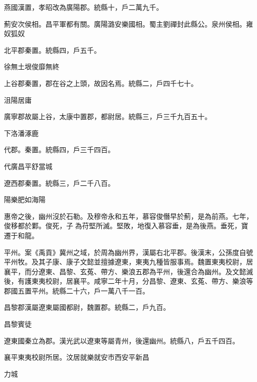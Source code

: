 \begin{pinyinscope}
 燕國漢置，孝昭改為廣陽郡。統縣十，戶二萬九千。



 薊安次侯相。昌平軍都有關。廣陽潞安樂國相。蜀主劉禪封此縣公。泉州侯相。雍奴狐奴



 北平郡秦置。統縣四，戶五千。



 徐無土垠俊靡無終



 上谷郡秦置，郡在谷之上頭，故因名焉。統縣二，戶四千七十。



 沮陽居庸



 廣寧郡故屬上谷，太康中置郡，都尉居。統縣三，戶三千九百五十。



 下洛潘涿鹿



 代郡。秦置。統縣四，戶三千四百。



 代廣昌平舒當城



 遼西郡秦置。統縣三，戶二千八百。



 陽樂肥如海陽



 惠帝之後，幽州沒於石勒。及穆帝永和五年，慕容俊僭早於薊，是為前燕。七年，俊移都於鄴。俊死，子為苻堅所滅。堅敗，地復入慕容垂，是為後燕。垂死，寶遷于和龍。



 平州。案《禹貢》冀州之域，於周為幽州界，漢屬右北平郡。後漢末，公孫度自號平州牧。及其子康、康子文懿並擅據遼東，東夷九種皆服事焉。魏置東夷校尉，居襄平，而分遼東、昌黎、玄菟、帶方、樂浪五郡為平州，後還合為幽州。及文懿滅後，有護東夷校尉，居襄平。咸寧二年十月，分昌黎、遼東、玄菟、帶方、樂浪等郡國五置平州。統縣二十六，戶一萬八千一百。



 昌黎郡漢屬遼東屬國都尉，魏置郡。統縣二，戶九百。



 昌黎賓徒



 遼東國秦立為郡。漢光武以遼東等屬青州，後還幽州。統縣八，戶五千四百。



 襄平東夷校尉所居。汶居就樂就安市西安平新昌



 力城




\end{pinyinscope}
